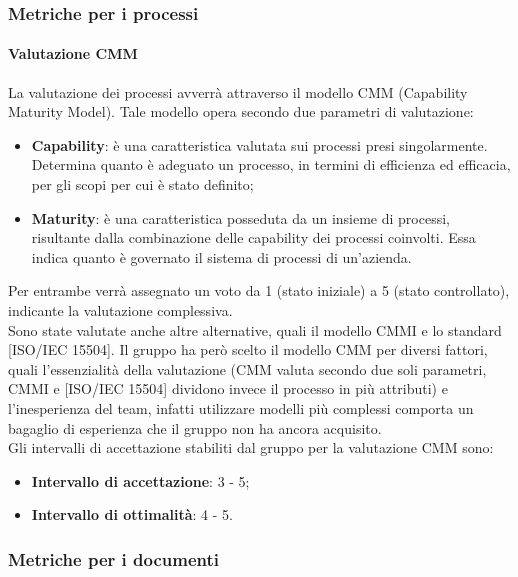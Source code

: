 \subsubsection{Metriche per i processi}


\paragraph{Valutazione CMM}
La valutazione dei processi avverrà attraverso il modello CMM (Capability Maturity Model). Tale modello opera secondo due parametri di valutazione:
\begin{itemize}
\item \textbf{Capability}: è una caratteristica valutata sui processi presi singolarmente. Determina quanto è adeguato un processo, in termini di efficienza ed efficacia, per gli scopi per cui è stato definito;
\item \textbf{Maturity}: è una caratteristica posseduta da un insieme di processi, risultante dalla combinazione delle capability dei processi coinvolti. Essa indica quanto è governato il sistema di processi di un'azienda.
\end{itemize}
Per entrambe verrà assegnato un voto da 1 (stato iniziale) a 5 (stato controllato), indicante la valutazione complessiva.\\
Sono state valutate anche altre alternative, quali il modello CMMI e lo standard [ISO/IEC 15504]. Il gruppo ha però scelto il modello CMM per diversi fattori, quali l’essenzialità della valutazione (CMM valuta secondo due soli parametri, CMMI e [ISO/IEC 15504] dividono invece il processo in più attributi) e l’inesperienza del team, infatti utilizzare modelli più complessi comporta un bagaglio di esperienza che il gruppo non ha ancora acquisito.\\
Gli intervalli di accettazione stabiliti dal gruppo per la valutazione CMM sono:
\begin{itemize}
\item \textbf{Intervallo di accettazione}: 3 - 5;
\item \textbf{Intervallo di ottimalità}: 4 - 5.
\end{itemize}
\subsubsection{Metriche per i documenti}
